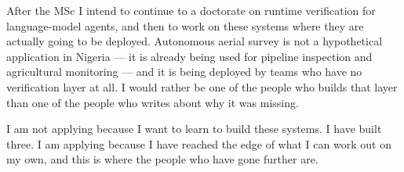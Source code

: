 \documentclass[12pt,single]{statement}
\begin{document}
After the MSc I intend to continue to a doctorate on runtime verification for
language-model agents, and then to work on these systems where they are
actually going to be deployed. Autonomous aerial survey is not a hypothetical
application in Nigeria --- it is already being used for pipeline inspection
and agricultural monitoring --- and it is being deployed by teams who have no
verification layer at all. I would rather be one of the people who builds
that layer than one of the people who writes about why it was missing.

I am not applying because I want to learn to build these systems. I have
built three. I am applying because I have reached the edge of what I can work
out on my own, and this is where the people who have gone further are.
\end{document}
